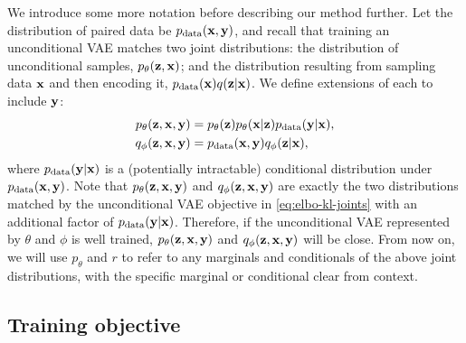 We introduce some more notation before describing our method further. Let the
distribution of paired data be $p_{\rm{data}}({\mathbf{x}}, {\mathbf{y}})$, and recall that
training an unconditional VAE matches two joint distributions: the distribution
of unconditional samples, $p_\theta({\mathbf{z}}, {\mathbf{x}})$; and the distribution
resulting from sampling data ${\mathbf{x}}$ and then encoding it, $p_{\rm{data}}({\mathbf{x}})q({\mathbf{z}}|{\mathbf{x}})$. We define extensions of each to include ${\mathbf{y}}$:
\begin{align}
  p_\theta({\mathbf{z}}, {\mathbf{x}}, {\mathbf{y}}) &= p_\theta({\mathbf{z}})p_\theta({\mathbf{x}}|{\mathbf{z}})p_{\rm{data}}({\mathbf{y}}|{\mathbf{x}}), \label{eq:pmodel} \\
  q_\phi({\mathbf{z}}, {\mathbf{x}}, {\mathbf{y}}) &= p_{\rm{data}}({\mathbf{x}}, {\mathbf{y}})q_\phi({\mathbf{z}}|{\mathbf{x}}), \label{eq:r}
\end{align}
where $p_{\rm{data}}({\mathbf{y}}|{\mathbf{x}})$ is a (potentially intractable) conditional
distribution under $p_{\rm{data}}({\mathbf{x}}, {\mathbf{y}})$.
%
Note that $p_\theta({\mathbf{z}}, {\mathbf{x}}, {\mathbf{y}})$ and $q_\phi({\mathbf{z}}, {\mathbf{x}}, {\mathbf{y}})$ are exactly the two distributions matched by the unconditional VAE
objective in \cref{eq:elbo-kl-joints} with an additional factor of
$p_{\rm{data}}({\mathbf{y}}|{\mathbf{x}})$.
%
Therefore, if the unconditional VAE represented by $\theta$ and $\phi$ is well
trained, $p_\theta({\mathbf{z}}, {\mathbf{x}}, {\mathbf{y}})$ and
$q_\phi({\mathbf{z}}, {\mathbf{x}}, {\mathbf{y}})$ will be close. From now on, we will use
$p_\theta$ and $r$ to refer to any marginals and conditionals of the above
joint distributions, with the specific marginal or conditional clear from
context.

\subsection{Training objective}


